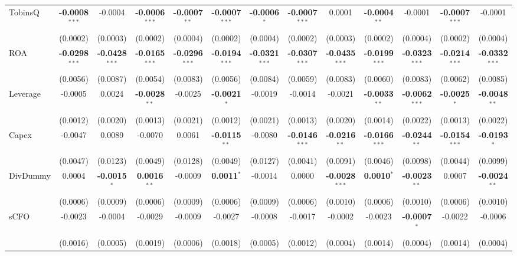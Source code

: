 \begin{landscape}
\begin{table}[H]
\begin{tabular}{lcccccccccccc}
TobinsQ & \textbf{-0.0008}$^{***}$ & -0.0004 & \textbf{-0.0006}$^{***}$ & \textbf{-0.0007}$^{**}$ & \textbf{-0.0007}$^{***}$ & \textbf{-0.0006}$^{*}$ & \textbf{-0.0007}$^{***}$ & 0.0001 & \textbf{-0.0004}$^{**}$ & -0.0001 & \textbf{-0.0007}$^{***}$ & -0.0001 \\
 & (0.0002) & (0.0003) & (0.0002) & (0.0004) & (0.0002) & (0.0004) & (0.0002) & (0.0003) & (0.0002) & (0.0004) & (0.0002) & (0.0004) \\
ROA & \textbf{-0.0298}$^{***}$ & \textbf{-0.0428}$^{***}$ & \textbf{-0.0165}$^{***}$ & \textbf{-0.0296}$^{***}$ & \textbf{-0.0194}$^{***}$ & \textbf{-0.0321}$^{***}$ & \textbf{-0.0307}$^{***}$ & \textbf{-0.0435}$^{***}$ & \textbf{-0.0199}$^{***}$ & \textbf{-0.0323}$^{***}$ & \textbf{-0.0214}$^{***}$ & \textbf{-0.0332}$^{***}$ \\
 & (0.0056) & (0.0087) & (0.0054) & (0.0083) & (0.0056) & (0.0084) & (0.0059) & (0.0083) & (0.0060) & (0.0083) & (0.0062) & (0.0085) \\
Leverage & -0.0005 & 0.0024 & \textbf{-0.0028}$^{**}$ & -0.0025 & \textbf{-0.0021}$^{*}$ & -0.0019 & -0.0014 & -0.0021 & \textbf{-0.0033}$^{**}$ & \textbf{-0.0062}$^{***}$ & \textbf{-0.0025}$^{*}$ & \textbf{-0.0048}$^{**}$ \\
 & (0.0012) & (0.0020) & (0.0013) & (0.0021) & (0.0012) & (0.0021) & (0.0013) & (0.0020) & (0.0014) & (0.0022) & (0.0013) & (0.0022) \\
Capex & -0.0047 & 0.0089 & -0.0070 & 0.0061 & \textbf{-0.0115}$^{**}$ & -0.0080 & \textbf{-0.0146}$^{***}$ & \textbf{-0.0216}$^{**}$ & \textbf{-0.0166}$^{***}$ & \textbf{-0.0244}$^{**}$ & \textbf{-0.0154}$^{***}$ & \textbf{-0.0193}$^{*}$ \\
 & (0.0047) & (0.0123) & (0.0049) & (0.0128) & (0.0049) & (0.0127) & (0.0041) & (0.0091) & (0.0046) & (0.0098) & (0.0044) & (0.0099) \\
DivDummy & 0.0004 & \textbf{-0.0015}$^{*}$ & \textbf{0.0016}$^{**}$ & -0.0009 & \textbf{0.0011}$^{*}$ & -0.0014 & 0.0000 & \textbf{-0.0028}$^{***}$ & \textbf{0.0010}$^{*}$ & \textbf{-0.0023}$^{**}$ & 0.0007 & \textbf{-0.0024}$^{**}$ \\
 & (0.0006) & (0.0009) & (0.0006) & (0.0009) & (0.0006) & (0.0009) & (0.0006) & (0.0010) & (0.0006) & (0.0010) & (0.0006) & (0.0010) \\
sCFO & -0.0023 & -0.0004 & -0.0029 & -0.0009 & -0.0027 & -0.0008 & -0.0017 & -0.0002 & -0.0023 & \textbf{-0.0007}$^{*}$ & -0.0022 & -0.0006 \\
 & (0.0016) & (0.0005) & (0.0019) & (0.0006) & (0.0018) & (0.0005) & (0.0012) & (0.0004) & (0.0014) & (0.0004) & (0.0014) & (0.0004) \\

\end{tabular}
\end{table}
\end{landscape}
